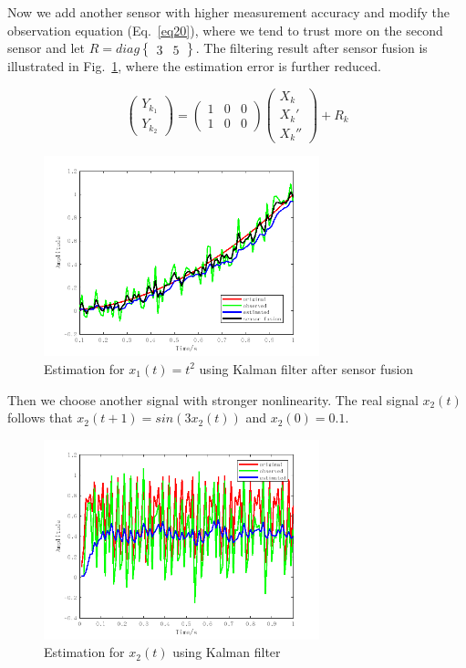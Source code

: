 \documentclass[conference]{IEEEtran}
\begin{document}
	Now we add another sensor with higher measurement accuracy and modify the observation equation (Eq.~\ref{eq20}), where we tend to trust more on the second sensor and let $R=diag\begin{Bmatrix}
	3 &5
	\end{Bmatrix}$. The filtering result after sensor fusion is illustrated in Fig.~\ref{fig2}, where the estimation error is further reduced.
	
	\begin{equation}
	\begin{pmatrix}
	Y_{k_{1}}\\ 
	Y_{k_{2}}
	\end{pmatrix}=\begin{pmatrix}
	1 &0  &0 \\ 
	1 &0  & 0
	\end{pmatrix}\begin{pmatrix}
	X_{k}\\ 
	{X_{k}}'\\ 
	{X_{k}}''
	\end{pmatrix}+R_{k}
	\label{eq20}
	\end{equation}
	
	
	\begin{figure}[htbp]
		\centering
		\includegraphics[width=8cm]{fig2.png}
		\caption{Estimation for $x_{1}(t)=t^{2}$ using Kalman filter after sensor fusion}
		\label{fig2}
	\end{figure}

	Then we choose another signal with stronger nonlinearity. The real signal $x_{2}(t)$ follows that  $x_{2}(t+1)=sin(3x_{2}(t))$ and $x_{2}(0)=0.1$. 
	
	
	\begin{figure}[htbp]
		\centering
		\includegraphics[width=8cm]{fig3.png}
		\caption{Estimation for $x_{2}(t)$ using Kalman filter}
		\label{fig3}
	\end{figure}
	
\end{document}
